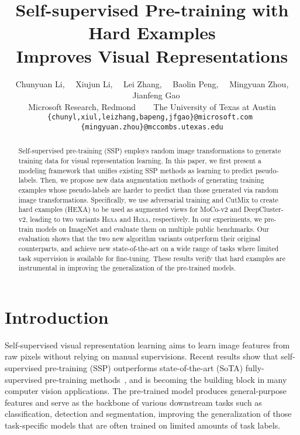 \documentclass[10pt,twocolumn,letterpaper]{article}
\newcommand{\shortname}{\textsc{Hexa}}
\begin{document}
\title{Self-supervised Pre-training with Hard Examples\\ Improves Visual Representations}

\author{
Chunyuan Li,  ~~Xiujun Li,  ~~Lei Zhang,  ~~Baolin Peng, ~~Mingyuan Zhou,  ~~Jianfeng Gao \\  Microsoft Research, Redmond ~~~  The University of Texas at Austin\\
{\tt\small   \{chunyl,xiul,leizhang,bapeng,jfgao\}@microsoft.com~ \{mingyuan.zhou\}@mccombs.utexas.edu}
}

\maketitle


\begin{abstract}



Self-supervised pre-training (SSP) employs random image transformations to generate training data for visual representation learning. In this paper, we first present a modeling framework that unifies existing SSP methods as learning to predict pseudo-labels. Then, we propose new data augmentation methods of generating training examples whose pseudo-labels are harder to predict than those generated via random image transformations. Specifically, we use adversarial training and CutMix to create hard examples (HEXA) to be used as augmented views for MoCo-v2 and DeepCluster-v2, leading to two variants \shortname{} and \shortname{}, respectively. In our experiments, we pre-train models on ImageNet and evaluate them on multiple public benchmarks. Our evaluation shows that the two new algorithm variants outperform their original counterparts, and achieve new state-of-the-art on a wide range of tasks where limited task supervision is available for fine-tuning. These results verify that hard examples are instrumental in improving the generalization of the pre-trained models.    





\end{abstract}

\section{Introduction}

Self-supervised visual representation learning aims to learn image features from raw pixels without relying on 
manual supervisions.
Recent results show that self-supervised pre-training (SSP) outperforms state-of-the-art (SoTA) fully-supervised pre-training methods~\cite{he2020momentum,caron2020unsupervised}, and is becoming
the building block in many computer vision applications.
The pre-trained model produces general-purpose features and serve as the backbone of various downstream tasks such as classification, detection and segmentation, improving the generalization of those task-specific models that are often trained on limited amounts of task labels. 
\end{document}

